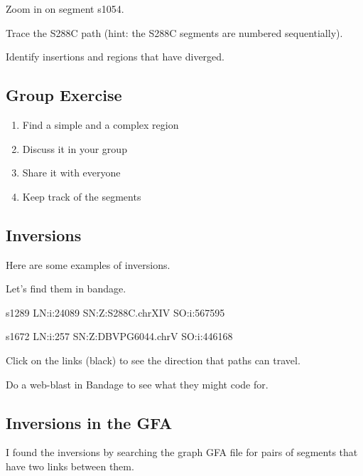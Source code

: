 \documentclass[
]{book}
\newenvironment{Shaded}{\begin{snugshade}}{\end{snugshade}}
\newcommand{\AttributeTok}[1]{\textcolor[rgb]{0.77,0.63,0.00}{#1}}
\newcommand{\FunctionTok}[1]{\textcolor[rgb]{0.00,0.00,0.00}{#1}}
\newcommand{\KeywordTok}[1]{\textcolor[rgb]{0.13,0.29,0.53}{\textbf{#1}}}
\newcommand{\NormalTok}[1]{#1}
\newcommand{\StringTok}[1]{\textcolor[rgb]{0.31,0.60,0.02}{#1}}
\providecommand{\tightlist}{%
  \setlength{\itemsep}{0pt}\setlength{\parskip}{0pt}}
\begin{document}
Zoom in on segment s1054.

Trace the S288C path (hint: the S288C segments are numbered sequentially).

Identify insertions and regions that have diverged.

\hypertarget{group-exercise}{%
\subsection*{Group Exercise}\label{group-exercise}}

\begin{enumerate}
\def\labelenumi{\arabic{enumi}.}
\tightlist
\item
  Find a simple and a complex region
\item
  Discuss it in your group
\item
  Share it with everyone
\item
  Keep track of the segments
\end{enumerate}

\hypertarget{inversions}{%
\subsection*{Inversions}\label{inversions}}

Here are some examples of inversions.

Let's find them in bandage.

s1289 LN:i:24089 SN:Z:S288C.chrXIV SO:i:567595

s1672 LN:i:257 SN:Z:DBVPG6044.chrV SO:i:446168

Click on the links (black) to see the direction that paths can travel.

Do a web-blast in Bandage to see what they might code for.

\hypertarget{inversions-in-the-gfa}{%
\subsection*{Inversions in the GFA}\label{inversions-in-the-gfa}}

I found the inversions by searching the graph GFA file for pairs of segments that have two links between them.

\begin{Shaded}
\end{Shaded}
\end{document}
